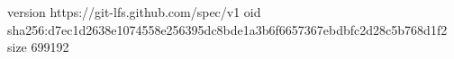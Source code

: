 version https://git-lfs.github.com/spec/v1
oid sha256:d7ec1d2638e1074558e256395dc8bde1a3b6f6657367ebdbfc2d28c5b768d1f2
size 699192
